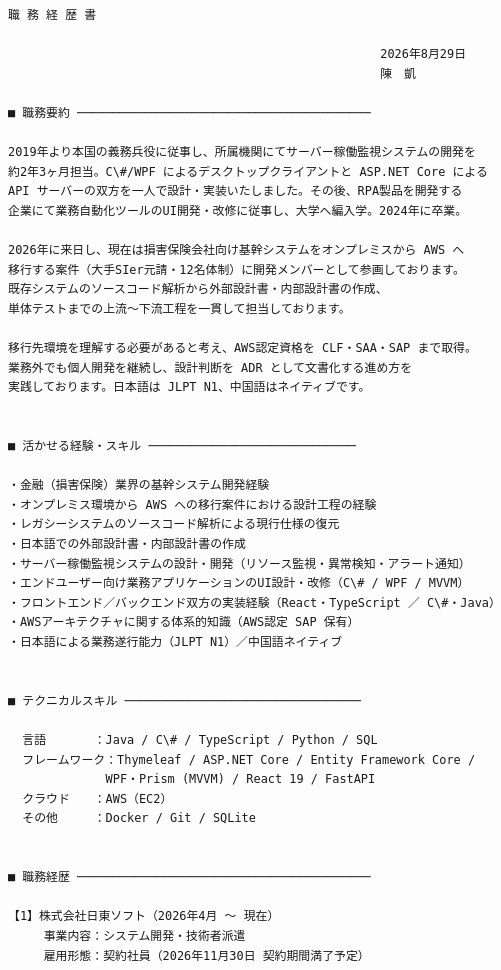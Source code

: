 \documentclass[paper=a4paper,fontsize=9.5pt,head_space=15mm,foot_space=15mm,gutter=18mm,fore_edge=18mm,baselineskip=15.5pt]{jlreq}
\begin{document}
\begin{Verbatim}[fontsize=\small,commandchars=\\\{\}]
職 務 経 歴 書

                                                    2026年8月29日
                                                    陳　凱

■ 職務要約 ─────────────────────────────────────────

2019年より本国の義務兵役に従事し、所属機関にてサーバー稼働監視システムの開発を
約2年3ヶ月担当。C\#/WPF によるデスクトップクライアントと ASP.NET Core による
API サーバーの双方を一人で設計・実装いたしました。その後、RPA製品を開発する
企業にて業務自動化ツールのUI開発・改修に従事し、大学へ編入学。2024年に卒業。

2026年に来日し、現在は損害保険会社向け基幹システムをオンプレミスから AWS へ
移行する案件（大手SIer元請・12名体制）に開発メンバーとして参画しております。
既存システムのソースコード解析から外部設計書・内部設計書の作成、
単体テストまでの上流〜下流工程を一貫して担当しております。

移行先環境を理解する必要があると考え、AWS認定資格を CLF・SAA・SAP まで取得。
業務外でも個人開発を継続し、設計判断を ADR として文書化する進め方を
実践しております。日本語は JLPT N1、中国語はネイティブです。


■ 活かせる経験・スキル ─────────────────────────────

・金融（損害保険）業界の基幹システム開発経験
・オンプレミス環境から AWS への移行案件における設計工程の経験
・レガシーシステムのソースコード解析による現行仕様の復元
・日本語での外部設計書・内部設計書の作成
・サーバー稼働監視システムの設計・開発（リソース監視・異常検知・アラート通知）
・エンドユーザー向け業務アプリケーションのUI設計・改修（C\# / WPF / MVVM）
・フロントエンド／バックエンド双方の実装経験（React・TypeScript ／ C\#・Java）
・AWSアーキテクチャに関する体系的知識（AWS認定 SAP 保有）
・日本語による業務遂行能力（JLPT N1）／中国語ネイティブ


■ テクニカルスキル ─────────────────────────────────

  言語　　　　：Java / C\# / TypeScript / Python / SQL
  フレームワーク：Thymeleaf / ASP.NET Core / Entity Framework Core /
  　　　　　　　WPF・Prism (MVVM) / React 19 / FastAPI
  クラウド　　：AWS（EC2）
  その他　　　：Docker / Git / SQLite


■ 職務経歴 ─────────────────────────────────────────

【1】株式会社日東ソフト（2026年4月 〜 現在）
　　　事業内容：システム開発・技術者派遣
　　　雇用形態：契約社員（2026年11月30日 契約期間満了予定）


\end{Verbatim}
\end{document}
